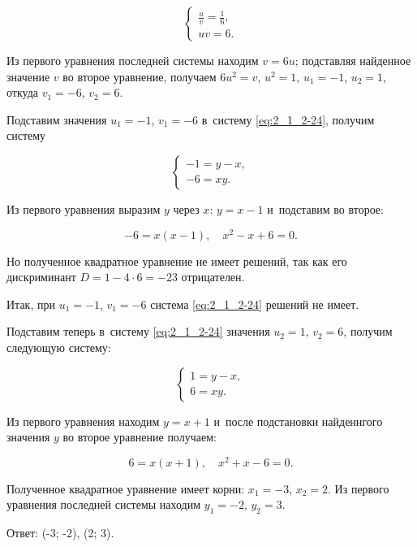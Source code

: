 \begin{equation*}
\begin{cases}
\displaystyle \frac{u}{v} = \frac{1}{6}, \\[10pt]
uv = 6.
\end{cases}
\end{equation*}

Из первого уравнения последней системы находим $v = 6u$;
подставляя найденное значение $v$ во второе уравнение,
получаем $6u^{2} = v$, $u^{2} = 1$, $u_{1} = -1$, $u_{2} = 1$,
откуда $v_{1} = -6$, $v_{2} = 6$.

Подставим значения $u_{1} = -1$, $v_{1} = -6$ в~систему \eqref{eq:2_1_2-24},
получим систему

\begin{equation*}
\begin{cases}
-1 = y - x, \\
-6 = xy.
\end{cases}
\end{equation*}

Из первого уравнения выразим $y$ через $x$: $y = x - 1$ и~подставим во второе:

\begin{equation*}
-6 = x(x - 1), \quad
x^{2} - x + 6 = 0.
\end{equation*}

Но полученное квадратное уравнение не имеет решений, так как его дискриминант
$D = 1 -4 \cdot 6 = -23$ отрицателен.

Итак, при $u_{1} = -1$, $v_{1} = -6$ система \eqref{eq:2_1_2-24} решений не имеет.

Подставим теперь в~систему \eqref{eq:2_1_2-24} значения $u_{2} = 1$, $v_{2} = 6$,
получим следующую систему:

\begin{equation*}
\begin{cases}
1 = y - x, \\
6 = xy.
\end{cases}
\end{equation*}

Из первого уравнения находим $y = x + 1$ и~после подстановки найденнгого значения
$y$ во второе уравнение получаем:

\begin{equation*}
6 = x(x + 1), \quad
x^{2} + x - 6 = 0.
\end{equation*}

Полученное квадратное уравнение имеет корни: $x_{1} = -3$, $x_{2} = 2$.
Из первого уравнения последней системы находим $y_{1} = -2$, $y_{2} = 3$.

Ответ: (-3; -2), (2; 3).
